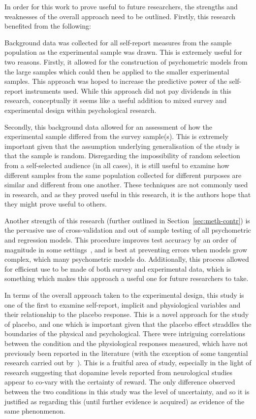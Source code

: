 In order for this work to prove useful to future researchers, the strengths and weaknesses of the overall approach need to be outlined. Firstly, this research benefited from the following:


Background data was collected for all self-report measures from the sample population as the experimental sample was drawn. This is extremely useful for two reasons. Firstly, it allowed for the construction of psychometric models from the large samples which could then be applied to the smaller experimental samples. This approach was hoped to increase the predictive power of the self-report instruments used. While this approach did not pay dividends in this research, conceptually it seems like a useful addition to mixed survey and experimental design within psychological research. 

Secondly, this background data allowed for an assessment of how the experimental sample differed from the survey sample(s). This is extremely important given that the assumption underlying generalisation of the study is that the sample is random. Disregarding the impossibility of random selection from a self-selected audience (in all cases), it is still useful to examine how different samples from the same population collected for different purposes are similar and different from one another. These techniques are not commonly used in research, and as they proved useful in this research, it is the authors hope that they might prove useful to others. 

Another strength of this research (further outlined in Section~\ref{sec:meth-contr}) is the pervasive use of cross-validation and out of sample testing of all psychometric and regression models. This procedure improves test accuracy by an order of magnitude in some settings~\cite{friedman2009elements}, and is best at preventing errors when models grow complex, which many psychometric models do. Additionally, this process allowed for efficient use to be made of both survey and experimental data, which is something which makes this approach a useful one for future researchers to take. 

In terms of the overall approach taken to the experimental design, this study is one of the first to examine self-report, implicit and physiological variables and their relationship to the placebo response. This is a novel approach for the study of placebo, and one which is important given that the placebo effect straddles the boundaries of the physical and psychological. There were intriguing correlations between the condition and the physiological responses measured, which have not previously been reported in the literature (with the exception of some tangential research carried out by~\citet{Fujita2000}). This is a fruitful area of study, especially in the light of research suggesting that dopamine levels reported from neurological studies appear to co-vary with the certainty of reward. The only difference observed between the two conditions in this study was the level of uncertainty, and so it is justified as regarding this (until further evidence is acquired) as evidence of the same phenonmenon. 

